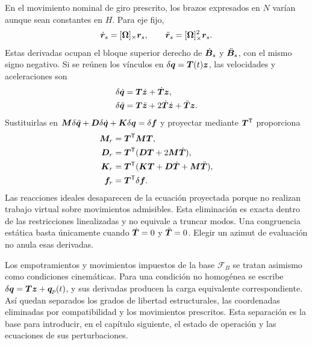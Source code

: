 En el movimiento nominal de giro prescrito, los brazos expresados en $N$
varían aunque sean constantes en $H$. Para eje fijo,
\begin{equation}
 \dot{\bm{r}}_s=[\bm{\Omega}]_{\times}\bm{r}_s,\qquad
 \ddot{\bm{r}}_s=[\bm{\Omega}]_{\times}^{2}\bm{r}_s.
\end{equation}
Estas derivadas ocupan el bloque superior derecho de $\dot{\boldsymbol{B}}_s$ y
$\ddot{\boldsymbol{B}}_s$, con el mismo signo negativo. Si se reúnen los vínculos en
$\delta\bm{q}=\boldsymbol{T}(t)\bm{z}$, las velocidades y aceleraciones son
\begin{align}
 \delta\dot{\bm{q}}&=\boldsymbol{T}\dot{\bm{z}}+\dot{\boldsymbol{T}}\bm{z},\\
 \delta\ddot{\bm{q}}&=\boldsymbol{T}\ddot{\bm{z}}
 +2\dot{\boldsymbol{T}}\dot{\bm{z}}+\ddot{\boldsymbol{T}}\bm{z}.
\end{align}
Sustituirlas en
$\boldsymbol{M}\delta\ddot{\bm{q}}+\boldsymbol{D}\delta\dot{\bm{q}}
+\boldsymbol{K}\delta\bm{q}=\delta\bm{f}$
y proyectar mediante $\boldsymbol{T}^{\mathsf T}$ proporciona
\begin{align}
 \boldsymbol{M}_r&=\boldsymbol{T}^{\mathsf T}\boldsymbol{M}\boldsymbol{T},\\
 \boldsymbol{D}_r&=\boldsymbol{T}^{\mathsf T}(\boldsymbol{D}\boldsymbol{T}+2\boldsymbol{M}\dot{\boldsymbol{T}}),\\
 \boldsymbol{K}_r&=\boldsymbol{T}^{\mathsf T}(\boldsymbol{K}\boldsymbol{T}+\boldsymbol{D}\dot{\boldsymbol{T}}
 +\boldsymbol{M}\ddot{\boldsymbol{T}}),\\
 \bm{f}_r&=\boldsymbol{T}^{\mathsf T}\delta\bm{f}.
 \label{eq:fe-reduccion-temporal}
\end{align}
Las reacciones ideales desaparecen de la ecuación proyectada porque no
realizan trabajo virtual sobre movimientos admisibles. Esta eliminación es
exacta dentro de las restricciones linealizadas y no equivale a truncar modos.
Una congruencia estática basta únicamente cuando $\dot{\boldsymbol{T}}=0$ y
$\ddot{\boldsymbol{T}}=0$. Elegir un azimut de evaluación no anula esas derivadas.

Los empotramientos y movimientos impuestos de la base $\mathcal F_B$ se
tratan asimismo como condiciones cinemáticas. Para una condición no homogénea
se escribe $\delta\bm{q}=\boldsymbol{T}\bm{z}+\bm{q}_p(t)$, y sus derivadas producen
la carga equivalente correspondiente. Así quedan separados los grados de
libertad estructurales, las coordenadas eliminadas por compatibilidad y los
movimientos prescritos. Esta separación es la base para introducir, en el
capítulo siguiente, el estado de operación y las ecuaciones de sus perturbaciones.

